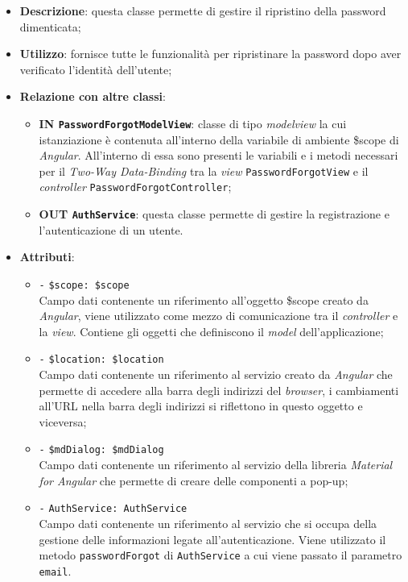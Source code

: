 \begin{itemize}
	\item \textbf{Descrizione}: questa classe permette di gestire il ripristino della password dimenticata;
	\item \textbf{Utilizzo}: fornisce tutte le funzionalità per ripristinare la password dopo aver verificato l'identità dell'utente;
	\item \textbf{Relazione con altre classi}:
	\begin{itemize}
		\item \textbf{IN \texttt{PasswordForgotModelView}}: classe di tipo \textit{modelview} la cui istanziazione è contenuta all'interno della variabile di ambiente \$scope di \textit{Angular}. All'interno di essa sono presenti le variabili e i metodi necessari per il \textit{Two-Way Data-Binding} tra la \textit{view} \texttt{PasswordForgotView} e il \textit{controller} \texttt{PasswordForgotController};
		\item \textbf{OUT \texttt{AuthService}}: questa classe permette di gestire la registrazione e l'autenticazione di un utente.
	\end{itemize}
	\item \textbf{Attributi}:
	\begin{itemize}
		\item \texttt{-} \texttt{\$scope: \$scope} \\
		Campo dati contenente un riferimento all'oggetto \$scope creato da \textit{Angular}, viene utilizzato come mezzo di comunicazione tra il \textit{controller} e la \textit{view}. Contiene gli oggetti che definiscono il \textit{model} dell'applicazione;
		\item \texttt{-} \texttt{\$location: \$location} \\
		Campo dati contenente un riferimento al servizio creato da \textit{Angular} che permette di accedere alla barra degli indirizzi del \textit{browser}, i cambiamenti all'URL nella barra degli indirizzi si riflettono in questo oggetto e viceversa;
		\item \texttt{-} \texttt{\$mdDialog: \$mdDialog} \\
		Campo dati contenente un riferimento al servizio della libreria \textit{Material for Angular} che permette di creare delle componenti a pop-up;
		\item \texttt{-} \texttt{AuthService: AuthService} \\
		Campo dati contenente un riferimento al servizio che si occupa della gestione delle informazioni legate all'autenticazione. Viene utilizzato il metodo \texttt{passwordForgot} di \texttt{AuthService} a cui viene passato il parametro \texttt{email}.

\end{itemize}
\end{itemize}
